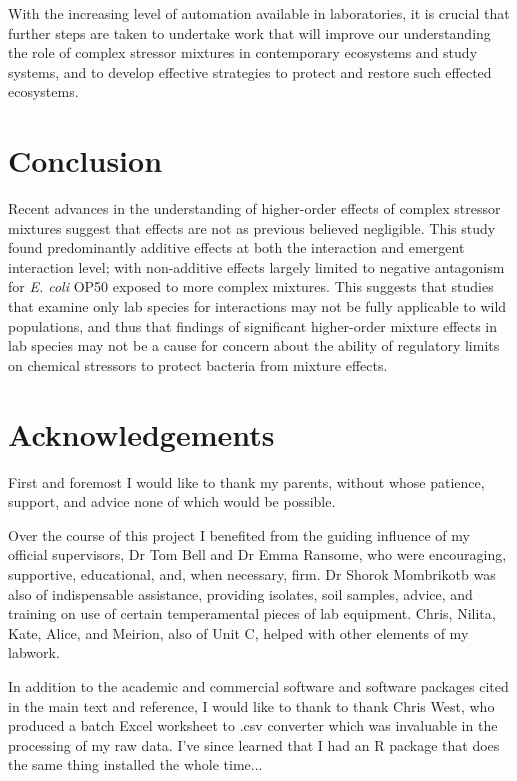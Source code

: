 \documentclass[10pt]{article}
\begin{document}
With the increasing level of automation available in laboratories, it is crucial that further steps are taken to undertake work that will improve our understanding the role of complex stressor mixtures in contemporary ecosystems and study systems, and to develop effective strategies to protect and restore such effected ecosystems.

\section{Conclusion}
\label{S:5}

Recent advances in the understanding of higher-order effects of complex stressor mixtures suggest that effects are not as previous believed negligible. This study found predominantly additive effects at both the interaction and emergent interaction level; with non-additive effects largely limited to negative antagonism for \textit{E. coli} OP50 exposed to more complex mixtures. This suggests that studies that examine only lab species for interactions may not be fully applicable to wild populations, and thus that findings of significant higher-order mixture effects in lab species may not be a cause for concern about the ability of regulatory limits on chemical stressors to protect bacteria from mixture effects.

\section{Acknowledgements}
\label{S:6}
First and foremost I would like to thank my parents, without whose patience, support, and advice none of which would be possible.

Over the course of this project I benefited from the guiding influence of my official supervisors, Dr Tom Bell and Dr Emma Ransome, who were encouraging, supportive, educational, and, when necessary, firm. Dr Shorok Mombrikotb was also of indispensable assistance, providing isolates, soil samples, advice, and training on use of certain temperamental pieces of lab equipment. Chris, Nilita, Kate, Alice, and Meirion, also of Unit C, helped with other elements of my labwork.

In addition to the academic and commercial software and software packages cited in the main text and reference, I would like to thank to thank Chris West, who produced a batch Excel worksheet to .csv converter which was invaluable in the processing of my raw data. I've since learned that I had an R package that does the same thing installed the whole time...
\end{document}
